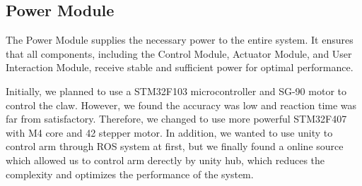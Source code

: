 \subsection*{Power Module}
The Power Module supplies the necessary power to the entire system. It ensures that all components, including the Control Module, Actuator Module, and User Interaction Module, receive stable and sufficient power for optimal performance.
  
Initially, we planned to use a STM32F103 microcontroller and SG-90 motor to control the claw. However, we found the accuracy was low and reaction time was far from satisfactory. Therefore, we changed to use more powerful STM32F407 with M4 core and 42 stepper motor. In addition, we wanted to use unity to control arm through ROS system at first, but we finally found a online source which allowed us to control arm derectly by unity hub, which reduces the complexity and optimizes the performance of the system.